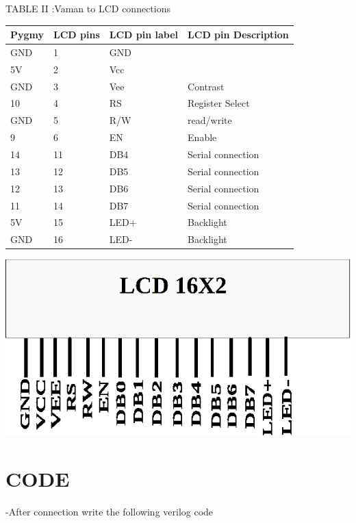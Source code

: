\documentclass[twocolumn,13pt]{article}
\begin{document}
\begin{center}
    TABLE II :Vaman to LCD connections
\end{center}
 \begin{tabular}{ |p{1.5cm}|p{1.5cm}|p{1.5cm}|p{1.5cm}| }
 \hline
 \setlength{\tabcolsep}{3pt}
Pygmy & LCD pins & LCD pin label & LCD pin Description\\
\hline
 GND & 1& GND & \\
 \hline
 5V & 2 & Vcc &\\
 \hline
 GND & 3 & Vee & Contrast\\
 \hline
 10 & 4 & RS & Register Select\\
 \hline
 GND & 5 & R/W & read/write\\
 \hline
 9 & 6 & EN &Enable\\
 \hline
 14 & 11 & DB4 & Serial connection\\
 \hline
 13 & 12 & DB5 & Serial connection\\
 \hline
 12 & 13 & DB6 & Serial connection\\
 \hline
 11 & 14 & DB7 & Serial connection\\
 \hline
 5V & 15 & LED+ & Backlight\\
 \hline
 GND & 16 & LED- & Backlight\\
 \hline
\end{tabular}



\includegraphics[scale=0.5]{figs/lcd.png} 
\section*{CODE}
-After connection write the following verilog code

\end{document}
